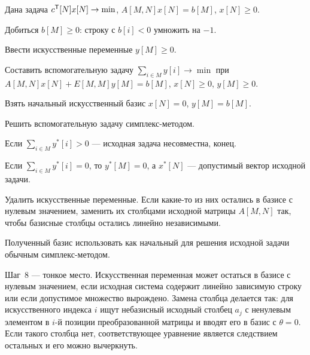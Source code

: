 \begin{algo}[title={Метод искусственного базиса}]
Дана задача $c^{\mathsf{T}}[N]x[N] \to \min$, $A[M,N]x[N] = b[M]$, $x[N] \ge 0$.
\begin{steps}
  \item Добиться $b[M] \ge 0$: строку с $b[i] < 0$ умножить на $-1$.
  \item Ввести искусственные переменные $y[M] \ge 0$.
  \item Составить вспомогательную задачу $\sum_{i \in M} y[i] \to \min$ при
        $A[M,N]x[N] + E[M,M]y[M] = b[M]$, $x[N] \ge 0$, $y[M] \ge 0$.
  \item Взять начальный искусственный базис $x[N] = 0$, $y[M] = b[M]$.
  \item Решить вспомогательную задачу симплекс-методом.
  \item Если $\sum_{i\in M} y^*[i] > 0$ — исходная задача несовместна, конец.
  \item Если $\sum_{i\in M} y^*[i] = 0$, то $y^*[M] = 0$, а $x^*[N]$ — допустимый
        вектор исходной задачи.
  \item Удалить искусственные переменные. Если какие-то из них остались в
        базисе с нулевым значением, заменить их столбцами исходной матрицы
        $A[M,N]$ так, чтобы базисные столбцы остались линейно независимыми.
  \item Полученный базис использовать как начальный для решения исходной задачи
        обычным симплекс-методом.
\end{steps}
\end{algo}

\begin{idea}
Шаг~8 — тонкое место. Искусственная переменная может остаться в базисе с
нулевым значением, если исходная система содержит линейно зависимую строку или
если допустимое множество вырождено. Замена столбца делается так: для
искусственного индекса $i$ ищут небазисный исходный столбец $a_j$ с ненулевым
элементом в $i$-й позиции преобразованной матрицы и вводят его в базис с
$\theta = 0$. Если такого столбца нет, соответствующее уравнение является
следствием остальных и его можно вычеркнуть.
\end{idea}
